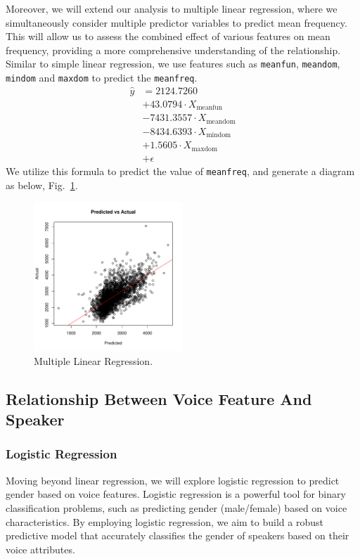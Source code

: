 \documentclass{article}
\begin{document}
	Moreover, we will extend our analysis to multiple linear regression, where we simultaneously consider multiple predictor variables to predict mean frequency. This will allow us to assess the combined effect of various features on mean frequency, providing a more comprehensive understanding of the relationship. Similar to simple linear regression, we use features such as \texttt{meanfun}, \texttt{meandom}, \texttt{mindom} and \texttt{maxdom} to predict the \texttt{meanfreq}.
	\begin{align*}
		\hat{y}&=2124.7260 \\&+ 43.0794\cdot X_{\text{meanfun}} \\&-7431.3557\cdot X_{\text{meandom}} \\&- 8434.6393\cdot X_{\text{mindom}} \\&+ 1.5605\cdot X_{\text{maxdom}} \\&+ \epsilon
	\end{align*}
	We utilize this formula to predict the value of \texttt{meanfreq}, and generate a diagram as below, Fig.~\ref{multiple_lr}.
	\begin{figure}
		\centering
		\includegraphics[width=0.5\textwidth]{graphs/multiple_lr.pdf}
		\caption{Multiple Linear Regression.}
		\label{multiple_lr}
	\end{figure}
	
	\subsection{Relationship Between Voice Feature And Speaker}
	
	\subsubsection{Logistic Regression}
	
	Moving beyond linear regression, we will explore logistic regression to predict gender based on voice features. Logistic regression is a powerful tool for binary classification problems, such as predicting gender (male/female) based on voice characteristics. By employing logistic regression, we aim to build a robust predictive model that accurately classifies the gender of speakers based on their voice attributes.
	
\end{document}
